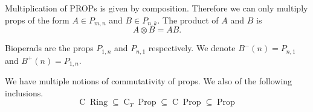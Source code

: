 \documentclass[11pt,a4paper]{article}
\DeclareMathOperator{\Prop}{Prop}
\DeclareMathOperator{\CC}{C}
\DeclareMathOperator{\Ring}{Ring}
\begin{document}
\begin{definition}
  Multiplication of PROPs is given by composition.
  Therefore we can only multiply props of the form $A \in P_{m,n}$ and
  $B \in P_{n,k}$.
  The product of $A$ and $B$ is
  \[
    A \otimes B = AB.
  \]
\end{definition}

\begin{definition}[Bioperds]
  Bioperads are the props $P_{1,n}$ and $P_{n,1}$ respectively.
  We denote $B^-(n) = P_{n,1}$ and $B^+(n) = P_{1,n}$.
\end{definition}

\begin{remark}
  We have multiple notions of commutativity of props.
  We also of the following inclusions.
  \[
    \CC\Ring \subseteq
    \CC_T\Prop \subseteq
    \CC\Prop \subseteq
    \Prop
  \]
\end{remark}
\end{document}
